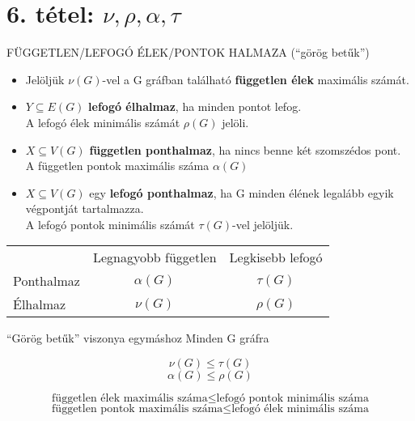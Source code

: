 \section{6. tétel: $\nu, \rho, \alpha, \tau$}



\begin{definicio}{FÜGGETLEN/LEFOGÓ ÉLEK/PONTOK HALMAZA (``görög betűk'')}
  \begin{itemize}
  \item Jelöljük $\nu(G)$-vel a G gráfban található \textbf{független élek} maximális számát.
  \item $Y \subseteq E(G)$ \textbf{lefogó élhalmaz}, ha minden pontot lefog.\\
    A lefogó élek minimális számát $\rho(G)$ jelöli.
  \item $X \subseteq V(G)$ \textbf{független ponthalmaz}, ha nincs benne két szomszédos pont.\\
    A független pontok maximális száma $\alpha(G)$
  \item $X \subseteq V(G)$ egy \textbf{lefogó ponthalmaz}, ha G minden élének legalább egyik végpontját tartalmazza.\\
    A lefogó pontok minimális számát $\tau(G)$-vel jelöljük.
  \end{itemize}
\begin{center}
  \begin{tabular}{l c c}
    & Legnagyobb független & Legkisebb lefogó\\
    Ponthalmaz & $\alpha(G)$ & $\tau(G)$\\
    Élhalmaz & $\nu(G)$ & $\rho(G)$
  \end{tabular}
\end{center}
\end{definicio}

\begin{tetel}{``Görög betűk'' viszonya egymáshoz}
  Minden G gráfra
  
  \begin{minipage}{0.2\textwidth}
    $$\nu(G) \leq \tau(G)$$
    $$\alpha(G) \leq \rho(G)$$
  \end{minipage}
  \begin{minipage}{0.6\textwidth}
    $$\text{független élek maximális száma} \leq \text{lefogó pontok minimális száma}$$
    $$\text{független pontok maximális száma} \leq \text{lefogó élek minimális száma}$$
  \end{minipage}
\end{tetel}


